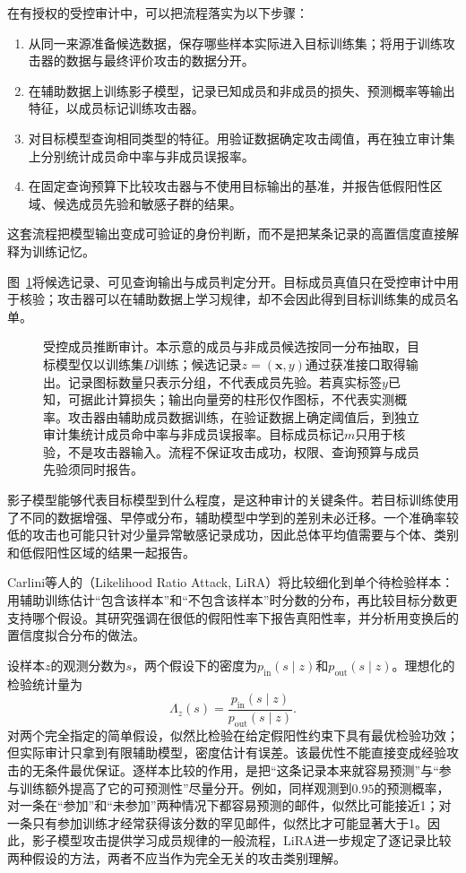 在有授权的受控审计中，可以把流程落实为以下步骤：
\begin{enumerate}
 \item 从同一来源准备候选数据，保存哪些样本实际进入目标训练集；将用于训练攻击器的数据与最终评价攻击的数据分开。
 \item 在辅助数据上训练影子模型，记录已知成员和非成员的损失、预测概率等输出特征，以成员标记训练攻击器。
 \item 对目标模型查询相同类型的特征。用验证数据确定攻击阈值，再在独立审计集上分别统计成员命中率与非成员误报率。
 \item 在固定查询预算下比较攻击器与不使用目标输出的基准，并报告低假阳性区域、候选成员先验和敏感子群的结果。
\end{enumerate}
这套流程把模型输出变成可验证的身份判断，而不是把某条记录的高置信度直接解释为训练记忆。

图~\ref{fig:trust-membership-inference}将候选记录、可见查询输出与成员判定分开。目标成员真值只在受控审计中用于核验；攻击器可以在辅助数据上学习规律，却不会因此得到目标训练集的成员名单。

\begin{figure}[!htb]
  \centering
  
  \caption{受控成员推断审计。本示意的成员与非成员候选按同一分布抽取，目标模型仅以训练集$D$训练；候选记录$z=(\bm x,y)$通过获准接口取得输出。记录图标数量只表示分组，不代表成员先验。若真实标签$y$已知，可据此计算损失；输出向量旁的柱形仅作图标，不代表实测概率。攻击器由辅助成员数据训练，在验证数据上确定阈值后，到独立审计集统计成员命中率与非成员误报率。目标成员标记$m$只用于核验，不是攻击器输入。流程不保证攻击成功，权限、查询预算与成员先验须同时报告。}
  \label{fig:trust-membership-inference}
\end{figure}

影子模型能够代表目标模型到什么程度，是这种审计的关键条件。若目标训练使用了不同的数据增强、早停或分布，辅助模型中学到的差别未必迁移。一个准确率较低的攻击也可能只针对少量异常敏感记录成功，因此总体平均值需要与个体、类别和低假阳性区域的结果一起报告。

Carlini等人的（Likelihood Ratio Attack, LiRA）将比较细化到单个待检验样本：用辅助训练估计“包含该样本”和“不包含该样本”时分数的分布，再比较目标分数更支持哪个假设。其研究强调在很低的假阳性率下报告真阳性率，并分析用变换后的置信度拟合分布的做法。

设样本$z$的观测分数为$s$，两个假设下的密度为$p_{\mathrm{in}}(s\mid z)$和$p_{\mathrm{out}}(s\mid z)$。理想化的检验统计量为
\begin{equation}
 \Lambda_z(s)=
 \frac{p_{\mathrm{in}}(s\mid z)}
      {p_{\mathrm{out}}(s\mid z)}.
 \label{eq:privacy-membership-likelihood}
\end{equation}
对两个完全指定的简单假设，似然比检验在给定假阳性约束下具有最优检验功效；但实际审计只拿到有限辅助模型，密度估计有误差。该最优性不能直接变成经验攻击的无条件最优保证。逐样本比较的作用，是把“这条记录本来就容易预测”与“参与训练额外提高了它的可预测性”尽量分开。例如，同样观测到$0.95$的预测概率，对一条在“参加”和“未参加”两种情况下都容易预测的邮件，似然比可能接近1；对一条只有参加训练才经常获得该分数的罕见邮件，似然比才可能显著大于1。因此，影子模型攻击提供学习成员规律的一般流程，LiRA进一步规定了逐记录比较两种假设的方法，两者不应当作为完全无关的攻击类别理解。


